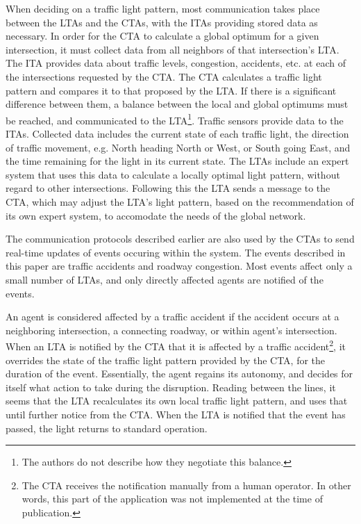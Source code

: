 \documentclass[11pt,letterpaper,onecolumn,twoside,openright,draft]{report}
\begin{document}
When deciding on a traffic light pattern, most communication takes place between the LTAs and the CTAs, with the ITAs providing stored data as necessary.
In order for the CTA to calculate a global optimum for a given intersection, it must collect data from all neighbors of that intersection's LTA.
The ITA provides data about traffic levels, congestion, accidents, etc. at each of the intersections requested by the CTA.
The CTA calculates a traffic light pattern and compares it to that proposed by the LTA.
If there is a significant difference between them, a balance between the local and global optimums must be reached, and communicated to the LTA\footnote{The authors do not describe how they negotiate this balance.}.
Traffic sensors provide data to the ITAs.
Collected data includes the current state of each traffic light, the direction of traffic movement, e.g. North heading North or West, or South going East, and the time remaining for the light in its current state.
The LTAs include an expert system that uses this data to calculate a locally optimal light pattern, without regard to other intersections.
Following this the LTA sends a message to the CTA, which may adjust the LTA's light pattern, based on the recommendation of its own expert system, to accomodate the needs of the global network.

The communication protocols described earlier are also used by the CTAs to send real-time updates of events occuring within the system.
The events described in this paper are traffic accidents and roadway congestion.
Most events affect only a small number of LTAs, and only directly affected agents are notified of the events.

An agent is considered affected by a traffic accident if the accident occurs at a neighboring intersection, a connecting roadway, or within agent's intersection.
When an LTA is notified by the CTA that it is affected by a traffic accident\footnote{The CTA receives the notification manually from a human operator. In other words, this part of the application was not implemented at the time of publication.}, it overrides the state of the traffic light pattern provided by the CTA, for the duration of the event.
Essentially, the agent regains its autonomy, and decides for itself what action to take during the disruption.
Reading between the lines, it seems that the LTA recalculates its own local traffic light pattern, and uses that until further notice from the CTA.
When the LTA is notified that the event has passed, the light returns to standard operation.
\end{document}
